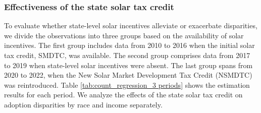 \documentclass[11pt,twoside,letterpaper]{article}
\begin{document}


\subsubsection{Effectiveness of the state solar tax credit}

To evaluate whether state-level solar incentives alleviate or exacerbate disparities, we divide the observations into three groups based on the availability of solar incentives. The first group includes data from 2010 to 2016 when the initial solar tax credit, SMDTC, was available. The second group comprises data from 2017 to 2019 when state-level solar incentives were absent. The last group spans from 2020 to 2022, when the New Solar Market Development Tax Credit (NSMDTC) was reintroduced. Table \ref{tab:count_regression_3 periods} shows the estimation results for each period. We analyze the effects of the state solar tax credit on adoption disparities by race and income separately.
\end{document}
